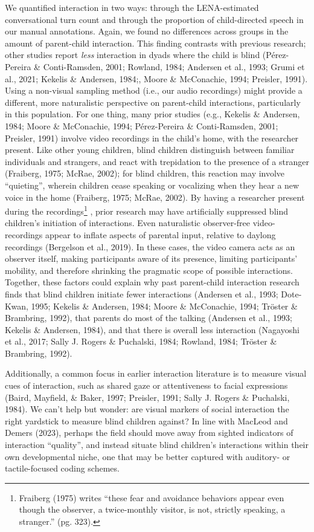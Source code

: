 \documentclass[
  man]{apa6}
\begin{document}
We quantified interaction in two ways: through the LENA-estimated conversational turn count and through the proportion of child-directed speech in our manual annotations. Again, we found no differences across groups in the amount of parent-child interaction. This finding contrasts with previous research; other studies report \emph{less} interaction in dyads where the child is blind (Pérez-Pereira \& Conti-Ramsden, 2001; Rowland, 1984; Andersen et al., 1993; Grumi et al., 2021; Kekelis \& Andersen, 1984;, Moore \& McConachie, 1994; Preisler, 1991). Using a non-visual sampling method (i.e., our audio recordings) might provide a different, more naturalistic perspective on parent-child interactions, particularly in this population. For one thing, many prior studies (e.g., Kekelis \& Andersen, 1984; Moore \& McConachie, 1994; Pérez-Pereira \& Conti-Ramsden, 2001; Preisler, 1991) involve video recordings in the child's home, with the researcher present. Like other young children, blind children distinguish between familiar individuals and strangers, and react with trepidation to the presence of a stranger (Fraiberg, 1975; McRae, 2002); for blind children, this reaction may involve ``quieting'', wherein children cease speaking or vocalizing when they hear a new voice in the home (Fraiberg, 1975; McRae, 2002). By having a researcher present during the recordings\footnote{Fraiberg (1975) writes ``these fear and avoidance behaviors appear even though the observer, a twice-monthly visitor, is not, strictly speaking, a stranger.'' (pg. 323).} , prior research may have artificially suppressed blind children's initiation of interactions. Even naturalistic observer-free video-recordings appear to inflate aspects of parental input, relative to daylong recordings (Bergelson et al., 2019). In these cases, the video camera acts as an observer itself, making participants aware of its presence, limiting participants' mobility, and therefore shrinking the pragmatic scope of possible interactions. Together, these factors could explain why past parent-child interaction research finds that blind children initiate fewer interactions (Andersen et al., 1993; Dote-Kwan, 1995; Kekelis \& Andersen, 1984; Moore \& McConachie, 1994; Tröster \& Brambring, 1992), that parents do most of the talking (Andersen et al., 1993; Kekelis \& Andersen, 1984), and that there is overall less interaction (Nagayoshi et al., 2017; Sally J. Rogers \& Puchalski, 1984; Rowland, 1984; Tröster \& Brambring, 1992).

Additionally, a common focus in earlier interaction literature is to measure visual cues of interaction, such as shared gaze or attentiveness to facial expressions (Baird, Mayfield, \& Baker, 1997; Preisler, 1991; Sally J. Rogers \& Puchalski, 1984). We can't help but wonder: are visual markers of social interaction the right yardstick to measure blind children against? In line with MacLeod and Demers (2023), perhaps the field should move away from sighted indicators of interaction ``quality'', and instead situate blind children's interactions within their own developmental niche, one that may be better captured with auditory- or tactile-focused coding schemes.
\end{document}
